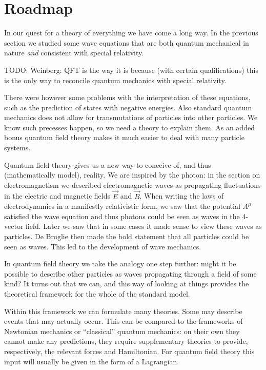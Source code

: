 \chapter{Roadmap}
In our quest for a theory of everything we have come a long way. In the previous section we studied some wave equations that are both quantum mechanical in nature \textit{and} consistent with special relativity.

TODO: Weinberg: QFT is the way it is because  (with certain qualifications) this is the only way to reconcile quantum mechanics with special relativity.


There were however some problems with the interpretation of these equations, such as the prediction of states with negative energies. Also standard quantum mechanics does not allow for transmutations of particles into other particles. We know such precesses happen, so we need a theory to explain them. As an added bonus quantum field theory makes it much easier to deal with many particle systems.

Quantum field theory gives us a new way to conceive of, and thus (mathematically model), reality. We are inspired by the photon: in the section on electromagnetism we described electromagnetic waves as propagating fluctuations in the electric and magnetic fields $\vec{E}$ and $\vec{B}$. When writing the laws of electrodynamics in a manifestly relativistic form, we saw that the potential $A^\mu$ satisfied the wave equation and thus photons could be seen as waves in the 4-vector field. Later we saw that in some cases it made sense to view these waves as particles. De Broglie then made the bold statement that all particles could be seen as waves. This led to the development of wave mechanics.

In quantum field theory we take the analogy one step further: might it be possible to describe other particles as waves propagating through a field of some kind? It turns out that we can, and this way of looking at things provides the theoretical framework for the whole of the standard model.

Within this framework we can formulate many theories. Some may describe events that may actually occur. This can be compared to the frameworks of Newtonian mechanics or ``classical'' quantum mechanics: on their own they cannot make any predictions, they require supplementary theories to provide, respectively, the relevant forces and Hamiltonian. For quantum field theory this input will usually be given in the form of a Lagrangian.

